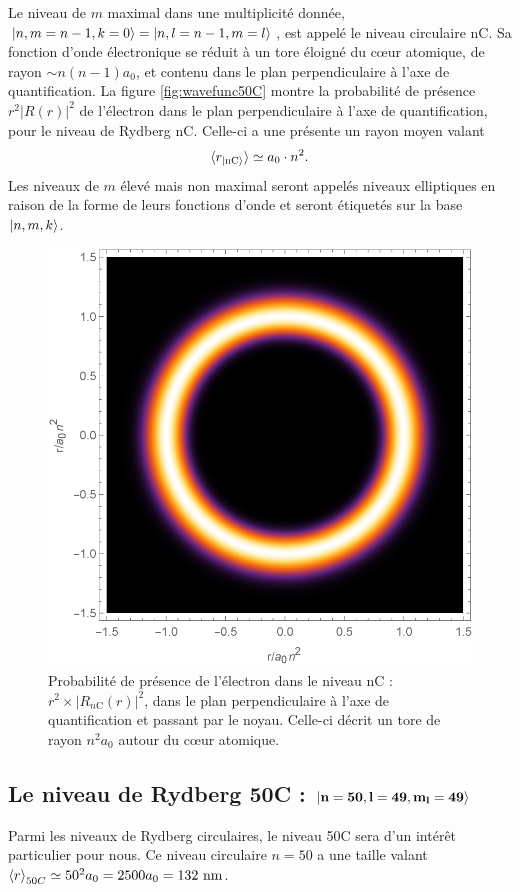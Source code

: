 Le niveau de $m$ maximal dans une multiplicité donnée, $\ket{n,m=n-1,k=0} =\ket{n,l=n-1,m=l}$, est appelé le niveau circulaire nC.
Sa fonction d'onde électronique se réduit à un tore éloigné du c\oe ur atomique, de rayon $\sim n(n-1)a_0$, et contenu dans le plan perpendiculaire à l'axe de quantification.
La figure \eqref{fig:wavefunc50C} montre la probabilité de présence $r^2|R(r)|^2$ de l'électron dans le plan perpendiculaire à l'axe de quantification, pour le niveau de Rydberg nC. Celle-ci a une présente un rayon moyen valant
\begin{equation}\label{eq:rayon_nC}
\braket{r_{\ket{\mathrm{nC}}}}\simeq  a_0 \cdot n^2.
\end{equation}
Les niveaux de $m$ élevé mais non maximal seront appelés niveaux elliptiques en raison de la forme de leurs fonctions d'onde et seront étiquetés sur la base $\ket{n,m,k}$.
\begin{figure}[!h]
	\centering
	\includegraphics[width=0.5\linewidth]{figures/WaveFunc_50C_}
	\caption[Fonction d'onde du niveau nC]{Probabilité de présence de l'électron dans le niveau nC : $r^2\times |R_{n\mathrm{C}}(r)|^2$, dans le plan perpendiculaire à l'axe de quantification et passant par le noyau.
	Celle-ci décrit un tore de rayon $n^2a_0$ autour du c\oe ur atomique.}
	\label{fig:wavefunc50C}
\end{figure}



\subsection{Le niveau de Rydberg 50C : $\mathbf{\ket{n=50,l=49,m_l=49}}$}

\noindent Parmi les niveaux de Rydberg circulaires, le niveau 50C sera d'un intérêt particulier pour nous.
Ce niveau circulaire $n=50$ a une taille valant $\braket{r}_{50C} \simeq 50^2 a_0 = 2500 a_0 = \numv{132}\si{\nano\meter}$.
	


